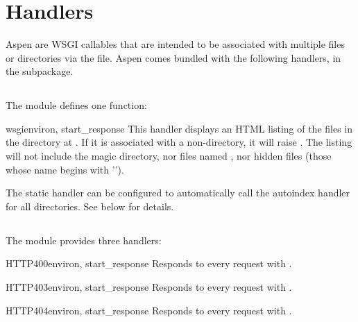 \section{Handlers}
\label {api-handlers}

Aspen  are WSGI callables that are intended to be associated with
multiple files or directories via the  file. Aspen comes
bundled with the following handlers, in the  subpackage.


\subsection{}
\label{api-handlers-http}

The  module defines one function:

\begin{funcdesc}{wsgi}{environ, start_response} This handler displays an HTML
listing of the files in the directory at . If
it is associated with a non-directory, it will raise . The
listing will not include the magic directory, nor files named
, nor hidden files (those whose name begins with '').
\end{funcdesc}

The static handler can be configured to automatically call the autoindex handler
for all directories. See below for details.


\subsection{}
\label{api-handlers-http}

The  module provides three handlers:

\begin{funcdesc}{HTTP400}{environ, start_response}
Responds to every request with .
\end{funcdesc}

\begin{funcdesc}{HTTP403}{environ, start_response}
Responds to every request with .
\end{funcdesc}

\begin{funcdesc}{HTTP404}{environ, start_response}
Responds to every request with .
\end{funcdesc}

